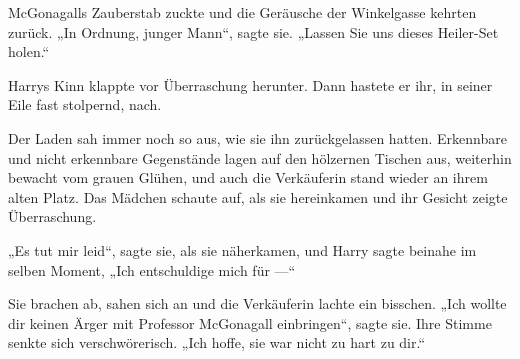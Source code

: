 McGonagalls Zauberstab zuckte und die Geräusche der Winkelgasse kehrten zurück.
„In Ordnung, junger Mann“, sagte sie.
„Lassen Sie uns dieses Heiler-Set holen.“

Harrys Kinn klappte vor Überraschung herunter. Dann hastete er ihr, in seiner Eile fast stolpernd, nach.

\later

Der Laden sah immer noch so aus, wie sie ihn zurückgelassen hatten. Erkennbare und nicht erkennbare Gegenstände lagen auf den hölzernen Tischen aus, weiterhin bewacht vom grauen Glühen, und auch die Verkäuferin stand wieder an ihrem alten Platz. Das Mädchen schaute auf, als sie hereinkamen und ihr Gesicht zeigte Überraschung.

„Es tut mir leid“, sagte sie, als sie näherkamen, und Harry sagte beinahe im selben Moment,
„Ich entschuldige mich für —“

Sie brachen ab, sahen sich an und die Verkäuferin lachte ein bisschen.
„Ich wollte dir keinen Ärger mit Professor McGonagall einbringen“, sagte sie. Ihre Stimme senkte sich verschwörerisch.
„Ich hoffe, sie war nicht zu hart zu dir.“

